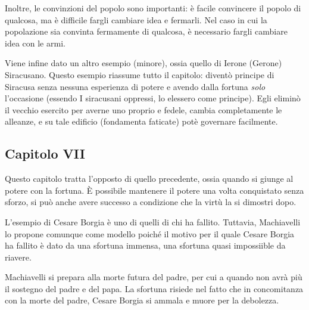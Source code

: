 \documentclass[a4paper]{article}
\begin{document}
Inoltre, le convinzioni del popolo sono importanti: è facile convincere il popolo di qualcosa,
ma è difficile fargli cambiare idea e fermarli.
Nel caso in cui la popolazione sia convinta fermamente di qualcosa, è necessario
fargli cambiare idea con le armi.


Viene infine dato un altro esempio (minore), ossia quello di Ierone (Gerone) Siracusano.
Questo esempio riassume tutto il capitolo: diventò principe di Siracusa
senza nessuna esperienza di potere e avendo dalla fortuna \textit{solo} l'occasione
(essendo I siracusani oppressi, lo elessero come principe).
Egli eliminò il vecchio esercito per averne uno proprio e fedele,
cambia completamente le alleanze, e su tale edificio (fondamenta faticate) potè
governare facilmente.

\pagebreak

\subsection{Capitolo VII}

Questo capitolo tratta l'opposto di quello precedente, ossia quando si giunge al potere
con la fortuna.
È possibile mantenere il potere una volta conquistato senza sforzo, si può
anche avere successo a condizione che la virtù la si dimostri dopo.


L'esempio di Cesare Borgia è uno di quelli di chi ha fallito.
Tuttavia, Machiavelli lo propone comunque come modello poiché
il motivo per il quale Cesare Borgia ha fallito è dato da una sfortuna immensa,
una sfortuna quasi impossiible da riavere.


Machiavelli si prepara alla morte futura del padre, per cui a quando
non avrà più il sostegno del padre e del papa.
La sfortuna risiede nel fatto che in concomitanza con la morte del padre,
Cesare Borgia si ammala e muore per la debolezza.
\end{document}
